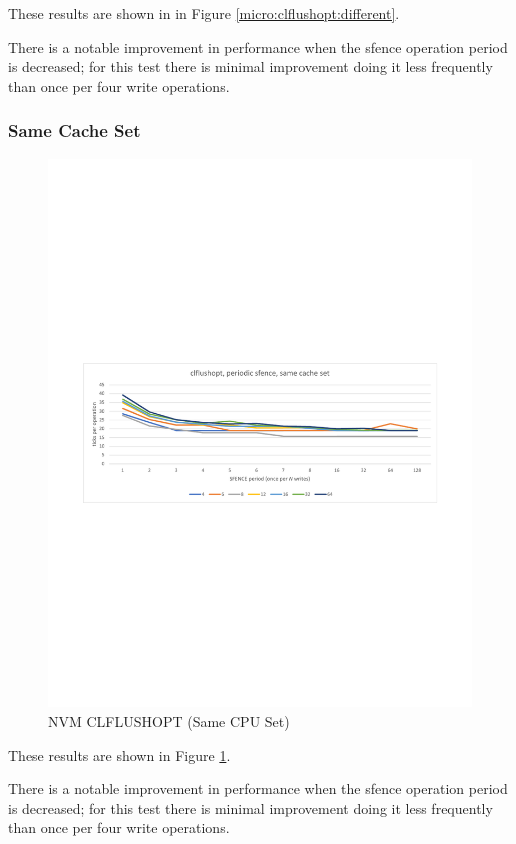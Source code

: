 These results are shown in in Figure 
\ref{micro:clflushopt:different}.

There is a notable improvement in performance when the sfence operation period is decreased; for this test there is minimal improvement doing it less frequently than once per four write operations.

\subsubsection{Same Cache Set}\label{impl:mb:clflushopt:sameset}

\begin{figure}
    \centering
    \caption{NVM CLFLUSHOPT (Same CPU Set)}\label{micro:clflushopt:same}
    \includegraphics[scale=0.35]{micro/nvm-clflushopt-periodic-same.pdf}
\end{figure}

These results are shown in Figure \ref{micro:clflushopt:same}.

There is a notable improvement in performance when the sfence operation period is decreased; for this test there is minimal improvement doing it less frequently than once per four write operations.


